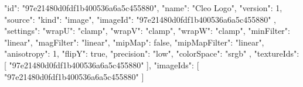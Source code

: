 {
  "id": "97e21480d0fdf1b400536a6a5c455880",
  "name": "Cleo Logo",
  "version": 1,
  "source": {
    "kind": "image",
    "imageId": "97e21480d0fdf1b400536a6a5c455880"
  },
  "settings": {
    "wrapU": "clamp",
    "wrapV": "clamp",
    "wrapW": "clamp",
    "minFilter": "linear",
    "magFilter": "linear",
    "mipMap": false,
    "mipMapFilter": "linear",
    "anisotropy": 1,
    "flipY": true,
    "precision": "low",
    "colorSpace": "srgb"
  },
  "textureIds": [
    "97e21480d0fdf1b400536a6a5c455880"
  ],
  "imageIds": [
    "97e21480d0fdf1b400536a6a5c455880"
  ]
}
